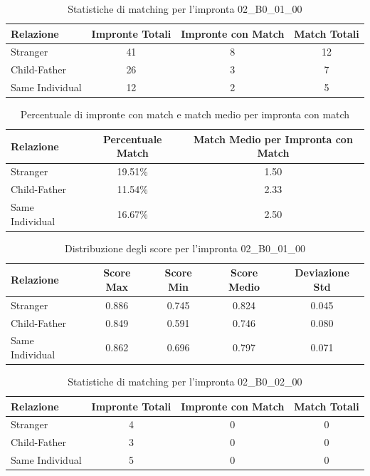 \begin{table}[htbp]
\centering
\caption{Statistiche di matching per l'impronta 02\_B0\_01\_00}
\label{tab:results_02_B0_01_00}
\begin{tabular}{|l|c|c|c|}
\hline
\textbf{Relazione} & \textbf{Impronte Totali} & \textbf{Impronte con Match} & \textbf{Match Totali} \\
\hline
Stranger & 41 & 8 & 12 \\
\hline
Child-Father & 26 & 3 & 7 \\
\hline
Same Individual & 12 & 2 & 5 \\
\hline
\end{tabular}
\end{table}


\begin{table}[htbp]
\centering
\caption{Percentuale di impronte con match e match medio per impronta con match}
\label{tab:match_percentage_02_B0_01_00}
\begin{tabular}{|l|c|c|}
\hline
\textbf{Relazione} & \textbf{Percentuale Match} & \textbf{Match Medio per Impronta con Match} \\
\hline
Stranger & 19.51\% & 1.50 \\
\hline
Child-Father & 11.54\% & 2.33 \\
\hline
Same Individual & 16.67\% & 2.50 \\
\hline
\end{tabular}
\end{table}


\begin{table}[htbp]
\centering
\caption{Distribuzione degli score per l'impronta 02\_B0\_01\_00}
\label{tab:scores_02_B0_01_00}
\begin{tabular}{|l|c|c|c|c|}
\hline
\textbf{Relazione} & \textbf{Score Max} & \textbf{Score Min} & \textbf{Score Medio} & \textbf{Deviazione Std} \\
\hline
Stranger & 0.886 & 0.745 & 0.824 & 0.045 \\
\hline
Child-Father & 0.849 & 0.591 & 0.746 & 0.080 \\
\hline
Same Individual & 0.862 & 0.696 & 0.797 & 0.071 \\
\hline
\end{tabular}
\end{table}


\begin{table}[htbp]
\centering
\caption{Statistiche di matching per l'impronta 02\_B0\_02\_00}
\label{tab:results_02_B0_02_00}
\begin{tabular}{|l|c|c|c|}
\hline
\textbf{Relazione} & \textbf{Impronte Totali} & \textbf{Impronte con Match} & \textbf{Match Totali} \\
\hline
Stranger & 4 & 0 & 0 \\
\hline
Child-Father & 3 & 0 & 0 \\
\hline
Same Individual & 5 & 0 & 0 \\
\hline
\end{tabular}
\end{table}


